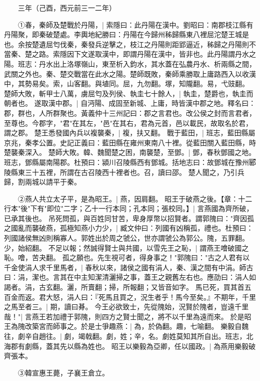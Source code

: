 　　三年（己酉，西元前三一二年）

　　①春，秦師及楚戰於丹陽，|{
	索隱曰：此丹陽在漢中。劉昭曰：南郡枝江縣有丹陽聚，即秦破楚處。李輿地紀勝曰：丹陽在今歸州秭歸縣東八裡屈沱楚王城是也。余按楚遺屈匄伐秦，秦發兵逆擊之，枝江之丹陽則距郢逼近，秭歸之丹陽則不當秦、楚之路。索隱因下文遂取漢中，即謂丹陽在漢中，皆非也。此丹陽謂丹水之陽。班志：丹水出上洛塚嶺山，東至析入鈞水，其水蓋在弘農丹水、析兩縣之間，武關之外也。秦、楚交戰當在此水之陽。楚師既敗，秦師乘勝取上庸路西入以收漢中，其勢易矣。索，山客翻。與埴同。屈，九勿翻。塚，知隴翻。易，弋豉翻。
	}
楚師大敗，斬甲士八萬，虜屈匄及列侯、執圭七十餘人，|{
	執圭，楚爵也，執圭而朝者也。
	}
遂取漢中郡。|{
	自沔陽、成固至新城、上庸，時皆漢中郡之地。釋名曰：郡，群也，人所群聚也。黃義仲十三州記曰：郡之言君也。改公侯之封而言君者，至尊也。今郡字，"君"在其左，"邑"在其右，君為元首，邑以載民，故取名於君，謂之郡。
	}
楚王悉發國內兵以複襲秦，|{
	複，扶又翻。
	}
戰于藍田，|{
	班志，藍田縣屬京兆，秦孝公置。史記正義曰：藍田縣在雍州東南八十裡。從藍田關入藍田縣，時楚襲秦深入。
	}
楚師大敗。韓、魏聞楚之困，南襲楚，至鄧。|{
	鄧，春秋鄧國之地。班志，鄧縣屬南陽郡。杜預曰：潁川召陵縣西有鄧城。括地志曰：故鄧城在豫州郾陵縣東三十五裡，所謂在古召陵西十裡者也。召，讀曰邵。
	}
楚人聞之，乃引兵歸，割兩城以請平于秦。

　　②燕人共立太子平，是為昭王。|{
	燕，因肩翻。
	}
昭王于破燕之後。【章：十二行本"後"下有"即位"二字；乙十一行本同；孔本同；張校同。】|{
	言燕國為齊所破，已承其後也。
	}
吊死問孤，與百姓同甘苦，卑身厚幣以招賢者。謂郭隗曰："齊因孤之國亂而襲破燕，孤極知燕小力少，|{
	臧文仲曰：列國有凶稱孤，禮也。杜預曰：列國諸侯無凶則稱寡人。郭姓出於周之虢公，世亦謂虢公為郭公。隗，五罪翻。少，始紹翻。
	}
不足以報；然誠得賢士與共國，以雪先王之恥，|{
	謂燕王噲破國之恥。噲，苦夬翻。
	}
孤之願也。先生視可者，得身事之！"郭隗曰："古之人君有以千金使涓人求千里馬者，|{
	春秋以來，諸侯之國有涓人，秦、漢之間有中涓。師古曰：涓，潔也。言其在中主知潔清灑掃之事，蓋王之親舊左右也。應劭曰：涓人如謁者。涓，古玄翻。灑，所賣翻；掃，所報翻；又皆音如字。
	}
馬已死，買其首五百金而返。君大怒，涓人曰：『死馬且買之，況生者乎！馬今至矣。』不期年，千里之馬至者三。|{
	期，讀曰朞。
	}
今王必欲致士，先從隗始，況賢於隗者，豈遠千里哉！"|{
	言燕王若加禮于郭隗，則四方之賢士聞之，將不以千里為遠而來。
	}
於是昭王為隗改築宮而師事之。於是士爭趣燕：|{
	為，於偽翻。趣，七喻翻。
	}
樂毅自魏往，劇辛自趙往。|{
	劇，竭戟翻。劇，姓；辛，名。劇姓莫知其所自出。班志，北海郡有劇縣，蓋其先以縣為姓也。
	}
昭王以樂毅為亞卿，任以國政。|{
	為燕用樂毅破齊張本。
	}

　　③韓宣惠王薨，子襄王倉立。

